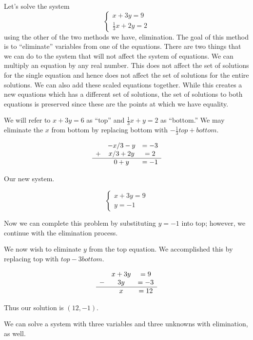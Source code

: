 \begin{example}
    Let's solve the system
    \[\begin{cases}
        x+3y=9 \\
        \frac{1}{3}x+2y =2
    \end{cases}\]
    using the other of the two methods we have, elimination. The goal of this method is to ``eliminate'' variables from one of the equations. There are two things that we can do to the system that will not affect the system of equations. We can multiply an equation by any real number. This does not affect the set of solutions for the single equation and hence does not affect the set of solutions for the entire solutions. We can also add these scaled equations together. While this creates a new equations which has a different set of solutions, the set of solutions to both equations is preserved since these are the points at which we have equality.

    We will refer to \(x+3y=6\) as ``top'' and \(\frac{1}{3}x+y =2\) as ``bottom.'' We may eliminate the \(x\) from bottom by replacing bottom with \(-\frac{1}{3}top + bottom.\)

    \[\begin{matrix}
        &-x/3-y & = -3 \\
        + & x/3+2y & = 2 \\
        \hline & 0+y & =-1
    \end{matrix}\]

    Our new system.

    \[\begin{cases}
        x+3y=9 \\
        y =-1
    \end{cases}\]

    Now we can complete this problem by substituting \(y=-1\) into top; however, we continue with the elimination process.

    We now wish to eliminate \(y\) from the top equation. We accomplished this by replacing top with \(top-3bottom.\)

    \[\begin{matrix}
        &x+3y & =9 \\
        - &3y & =-3 \\
        \hline & x & = 12
    \end{matrix}\]

    Thus our solution is \(\left(12,-1\right).\)
\end{example}

We can solve a system with three variables and three unknowns with elimination, as well.